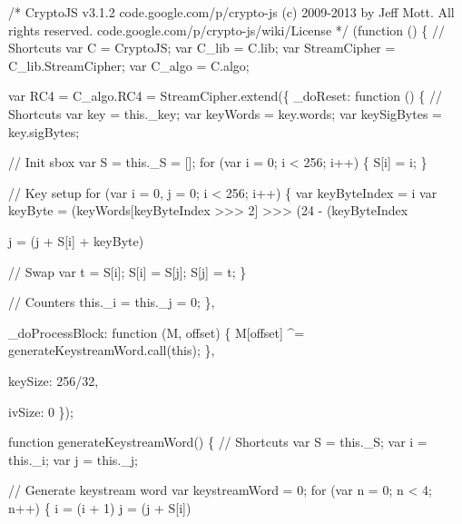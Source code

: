 \begin{DoxyCodeInclude}
\textcolor{comment}{/*}
\textcolor{comment}{CryptoJS v3.1.2}
\textcolor{comment}{code.google.com/p/crypto-js}
\textcolor{comment}{(c) 2009-2013 by Jeff Mott. All rights reserved.}
\textcolor{comment}{code.google.com/p/crypto-js/wiki/License}
\textcolor{comment}{*/}
(\textcolor{keyword}{function} () \{
    \textcolor{comment}{// Shortcuts}
    var C = CryptoJS;
    var C\_lib = C.lib;
    var StreamCipher = C\_lib.StreamCipher;
    var C\_algo = C.algo;

    var RC4 = C\_algo.RC4 = StreamCipher.extend(\{
        \_doReset: \textcolor{keyword}{function} () \{
            \textcolor{comment}{// Shortcuts}
            var key = this.\_key;
            var keyWords = key.words;
            var keySigBytes = key.sigBytes;

            \textcolor{comment}{// Init sbox}
            var S = this.\_S = [];
            \textcolor{keywordflow}{for} (var i = 0; i < 256; i++) \{
                S[i] = i;
            \}

            \textcolor{comment}{// Key setup}
            \textcolor{keywordflow}{for} (var i = 0, j = 0; i < 256; i++) \{
                var keyByteIndex = i %
                var keyByte = (keyWords[keyByteIndex >>> 2] >>> (24 - (keyByteIndex %

                j = (j + S[i] + keyByte) %

                \textcolor{comment}{// Swap}
                var t = S[i];
                S[i] = S[j];
                S[j] = t;
            \}

            \textcolor{comment}{// Counters}
            this.\_i = this.\_j = 0;
        \},

        \_doProcessBlock: \textcolor{keyword}{function} (M, offset) \{
            M[offset] ^= generateKeystreamWord.call(\textcolor{keyword}{this});
        \},

        keySize: 256/32,

        ivSize: 0
    \});

    \textcolor{keyword}{function} generateKeystreamWord() \{
        \textcolor{comment}{// Shortcuts}
        var S = this.\_S;
        var i = this.\_i;
        var j = this.\_j;

        \textcolor{comment}{// Generate keystream word}
        var keystreamWord = 0;
        \textcolor{keywordflow}{for} (var n = 0; n < 4; n++) \{
            i = (i + 1) %
            j = (j + S[i]) %


\end{DoxyCodeInclude}
